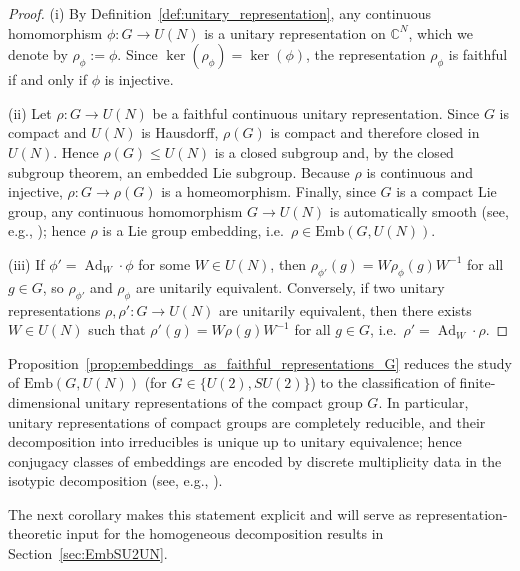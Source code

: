 \documentclass{article}%
\theoremstyle{definition}
\numberwithin{equation}{section}
\newcommand{\C}{\mathbb{C}}
\newcommand{\Emb}{\mathrm{Emb}}
\DeclareMathOperator{\Ad}{Ad}
\begin{document}
\begin{proof}
(i) By Definition~\ref{def:unitary_representation}, any continuous homomorphism $\phi:G\to U(N)$ is a unitary representation on $\C^N$,
which we denote by $\rho_\phi:=\phi$. Since $\ker(\rho_\phi)=\ker(\phi)$, the representation $\rho_\phi$ is faithful if and only if
$\phi$ is injective.

(ii) Let $\rho:G\to U(N)$ be a faithful continuous unitary representation. Since $G$ is compact and $U(N)$ is Hausdorff, $\rho(G)$ is
compact and therefore closed in $U(N)$. Hence $\rho(G)\le U(N)$ is a closed subgroup and, by the closed subgroup theorem, an embedded
Lie subgroup. Because $\rho$ is continuous and injective, $\rho:G\to\rho(G)$ is a homeomorphism. Finally, since $G$ is a compact Lie
group, any continuous homomorphism $G\to U(N)$ is automatically smooth (see, e.g., \cite[Ch.~4]{Hall2015}); hence $\rho$ is a Lie
group embedding, i.e.\ $\rho\in\Emb(G,U(N))$.

(iii) If $\phi'=\Ad_W\cdot\phi$ for some $W\in U(N)$, then $\rho_{\phi'}(g)=W\rho_\phi(g)W^{-1}$ for all $g\in G$, so $\rho_{\phi'}$
and $\rho_\phi$ are unitarily equivalent. Conversely, if two unitary representations $\rho,\rho':G\to U(N)$ are unitarily equivalent,
then there exists $W\in U(N)$ such that $\rho'(g)=W\rho(g)W^{-1}$ for all $g\in G$, i.e.\ $\rho'=\Ad_W\cdot\rho$.
\end{proof}

\noindent
Proposition~\ref{prop:embeddings_as_faithful_representations_G} reduces the study of $\Emb(G,U(N))$
(for $G\in\{U(2),SU(2)\}$) to the classification of finite-dimensional unitary representations of the
compact group $G$. In particular, unitary representations of compact groups are completely reducible,
and their decomposition into irreducibles is unique up to unitary equivalence; hence conjugacy
classes of embeddings are encoded by discrete multiplicity data in the isotypic decomposition (see,
e.g., \cite{BrockerDieck1985,Hall2015}).

The next corollary makes this statement explicit and will serve as representation-theoretic input
for the homogeneous decomposition results in Section~\ref{sec:EmbSU2UN}.
\end{document}
